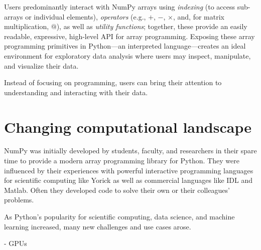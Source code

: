 Users predominantly interact with NumPy arrays using {\em indexing} (to access sub-arrays or individual elements), {\em operators} (e.g., $+$, $-$, $\times$, and, for matrix multiplication, $@$), as well as {\em utility functions}; together, these provide an easily readable, expressive, high-level API for array programming.  Exposing these array programming primitives in Python---an interpreted language---creates an ideal environment for exploratory data analysis \cite{perez2007ipython} where users may inspect, manipulate, and visualize their data.

Instead of focusing on programming, users can bring their attention to understanding and interacting with their data.


\section*{Changing computational landscape}

NumPy was initially developed by students, faculty, and researchers in their
spare time to provide a modern array programming library for Python.
They were influenced by their experiences with powerful interactive programming
languages for scientific computing like Yorick \cite{munro1995using} as well
as commercial languages like IDL and Matlab.
Often they developed code to solve their own or their colleagues' problems.

As Python's popularity for scientific computing, data science, and machine
learning increased, many new challenges and use cases arose.


- GPUs

